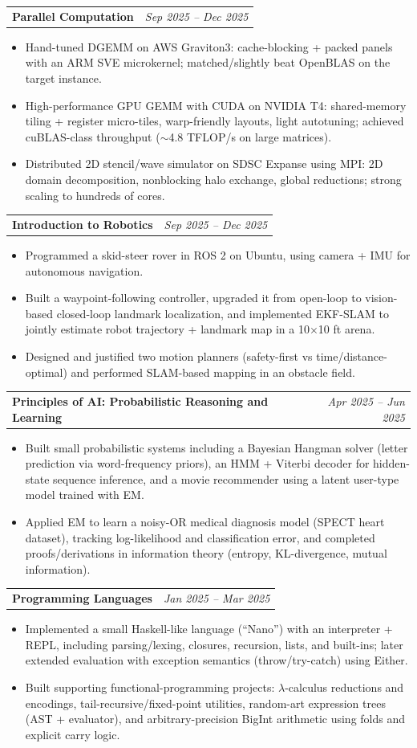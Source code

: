 \documentclass[letterpaper,11pt]{article}
\makeatletter
\newcommand{\resumeItem}[1]{
  \item\small{
    {#1 \vspace{-2pt}}
  }
}
\newcommand{\resumeCourseheading}[2]{
  \vspace{-1pt}\item
    \begin{tabular*}{0.97\textwidth}[t]{l@{\extracolsep{\fill}}r}
      \textbf{#1} & \textit{\small #2} \\
    \end{tabular*}\vspace{-5pt}
}
\newcommand{\resumeItemListStart}{\begin{itemize}}
\newcommand{\resumeItemListEnd}{\end{itemize}\vspace{-5pt}}
\makeatother
\begin{document}
    \resumeCourseheading
      {Parallel Computation}{Sep 2025 -- Dec 2025}
      \resumeItemListStart
        \resumeItem{Hand-tuned DGEMM on AWS Graviton3: cache-blocking + packed panels with an ARM SVE microkernel; matched/slightly beat OpenBLAS on the target instance.}
        \resumeItem{High-performance GPU GEMM with CUDA on NVIDIA T4: shared-memory tiling + register micro-tiles, warp-friendly layouts, light autotuning; achieved cuBLAS-class throughput ($\sim$4.8 TFLOP/s on large matrices).}
        \resumeItem{Distributed 2D stencil/wave simulator on SDSC Expanse using MPI: 2D domain decomposition, nonblocking halo exchange, global reductions; strong scaling to hundreds of cores.}
      \resumeItemListEnd

    \resumeCourseheading
      {Introduction to Robotics}{Sep 2025 -- Dec 2025}
      \resumeItemListStart
        \resumeItem{Programmed a skid-steer rover in ROS 2 on Ubuntu, using camera + IMU for autonomous navigation.}
        \resumeItem{Built a waypoint-following controller, upgraded it from open-loop to vision-based closed-loop landmark localization, and implemented EKF-SLAM to jointly estimate robot trajectory + landmark map in a 10$\times$10 ft arena.}
        \resumeItem{Designed and justified two motion planners (safety-first vs time/distance-optimal) and performed SLAM-based mapping in an obstacle field.}
      \resumeItemListEnd

    \resumeCourseheading
      {Principles of AI: Probabilistic Reasoning and Learning}{Apr 2025 -- Jun 2025}
      \resumeItemListStart
        \resumeItem{Built small probabilistic systems including a Bayesian Hangman solver (letter prediction via word-frequency priors), an HMM + Viterbi decoder for hidden-state sequence inference, and a movie recommender using a latent user-type model trained with EM.}
        \resumeItem{Applied EM to learn a noisy-OR medical diagnosis model (SPECT heart dataset), tracking log-likelihood and classification error, and completed proofs/derivations in information theory (entropy, KL-divergence, mutual information).}
      \resumeItemListEnd

    \resumeCourseheading
      {Programming Languages}{Jan 2025 -- Mar 2025}
      \resumeItemListStart
        \resumeItem{Implemented a small Haskell-like language (``Nano'') with an interpreter + REPL, including parsing/lexing, closures, recursion, lists, and built-ins; later extended evaluation with exception semantics (throw/try-catch) using Either.}
        \resumeItem{Built supporting functional-programming projects: $\lambda$-calculus reductions and encodings, tail-recursive/fixed-point utilities, random-art expression trees (AST + evaluator), and arbitrary-precision BigInt arithmetic using folds and explicit carry logic.}
      \resumeItemListEnd
\end{document}
